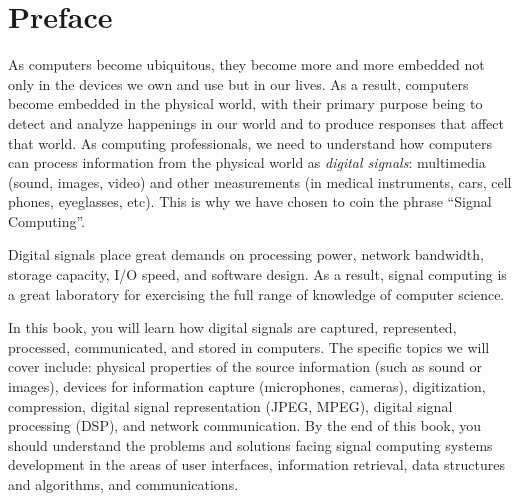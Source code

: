 
%
%
%
%
%

\chapter*{Preface}


As computers become ubiquitous, they become more and more embedded not
only in the devices we own and use but in our lives. As a result,
computers become embedded in the physical world, with their primary
purpose being to detect and analyze happenings in our world and to
produce responses that affect that world. As computing professionals,
we need to understand how computers can process information from the
physical world as \emph{digital signals}: multimedia (sound, images,
video) and other measurements (in medical instruments, cars, cell
phones, eyeglasses, etc). This is why we have chosen to coin the
phrase ``Signal Computing''.

Digital signals place great demands on processing power, network
bandwidth, storage capacity, I/O speed, and software design. As a
result, signal computing is a great laboratory for exercising the full
range of knowledge of computer science.

In this book, you will learn how digital signals are captured,
represented, processed, communicated, and stored in computers. The
specific topics we will cover include: physical properties of the
source information (such as sound or images), devices for information
capture (microphones, cameras), digitization, compression, digital
signal representation (JPEG, MPEG), digital signal processing (DSP),
and network communication.  By the end of this book, you should
understand the problems and solutions facing signal computing systems
development in the areas of user interfaces, information retrieval,
data structures and algorithms, and communications.

